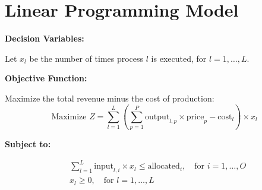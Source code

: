 \documentclass{article}
\begin{document}
\section*{Linear Programming Model}

\textbf{Decision Variables:}

Let \( x_l \) be the number of times process \( l \) is executed, for \( l = 1, \ldots, L \).

\textbf{Objective Function:}

Maximize the total revenue minus the cost of production:
\[
\text{Maximize } Z = \sum_{l=1}^{L} \left( \sum_{p=1}^{P} \text{output}_{l,p} \times \text{price}_p - \text{cost}_l \right) \times x_l
\]

\textbf{Subject to:}

\begin{align*}
& \sum_{l=1}^{L} \text{input}_{l,i} \times x_l \leq \text{allocated}_i, \quad \text{for } i = 1, \ldots, O \\
& x_l \geq 0, \quad \text{for } l = 1, \ldots, L
\end{align*}
\end{document}
